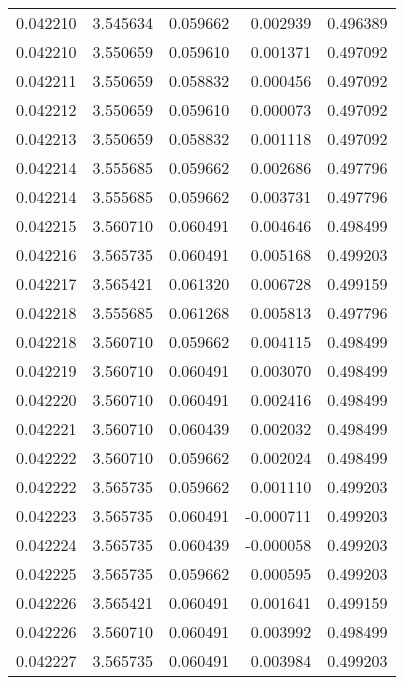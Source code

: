 \begin{tabular}{lrrrr}
0.042210    &  3.545634 &  0.059662 &  0.002939 &             0.496389 \\
0.042210    &  3.550659 &  0.059610 &  0.001371 &             0.497092 \\
0.042211    &  3.550659 &  0.058832 &  0.000456 &             0.497092 \\
0.042212    &  3.550659 &  0.059610 &  0.000073 &             0.497092 \\
0.042213    &  3.550659 &  0.058832 &  0.001118 &             0.497092 \\
0.042214    &  3.555685 &  0.059662 &  0.002686 &             0.497796 \\
0.042214    &  3.555685 &  0.059662 &  0.003731 &             0.497796 \\
0.042215    &  3.560710 &  0.060491 &  0.004646 &             0.498499 \\
0.042216    &  3.565735 &  0.060491 &  0.005168 &             0.499203 \\
0.042217    &  3.565421 &  0.061320 &  0.006728 &             0.499159 \\
0.042218    &  3.555685 &  0.061268 &  0.005813 &             0.497796 \\
0.042218    &  3.560710 &  0.059662 &  0.004115 &             0.498499 \\
0.042219    &  3.560710 &  0.060491 &  0.003070 &             0.498499 \\
0.042220    &  3.560710 &  0.060491 &  0.002416 &             0.498499 \\
0.042221    &  3.560710 &  0.060439 &  0.002032 &             0.498499 \\
0.042222    &  3.560710 &  0.059662 &  0.002024 &             0.498499 \\
0.042222    &  3.565735 &  0.059662 &  0.001110 &             0.499203 \\
0.042223    &  3.565735 &  0.060491 & -0.000711 &             0.499203 \\
0.042224    &  3.565735 &  0.060439 & -0.000058 &             0.499203 \\
0.042225    &  3.565735 &  0.059662 &  0.000595 &             0.499203 \\
0.042226    &  3.565421 &  0.060491 &  0.001641 &             0.499159 \\
0.042226    &  3.560710 &  0.060491 &  0.003992 &             0.498499 \\
0.042227    &  3.565735 &  0.060491 &  0.003984 &             0.499203 \\

\end{tabular}
